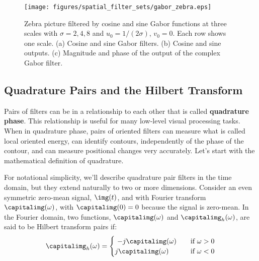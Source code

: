 \begin{figure}[t]
	\texttt{[image: figures/spatial\_filter\_sets/gabor\_zebra.eps]}
	\caption{Zebra picture filtered by cosine and sine Gabor functions at three scales with $\sigma = 2,4,8$ and $u_0 = 1/(2\sigma)$, $v_0=0$. Each row shows one scale. (a) Cosine and sine Gabor filters. (b) Cosine and sine outputs. (c) Magnitude and phase of the output of the complex Gabor filter.}
	\label{fig:gabor_zebra}
\end{figure}

\subsection{Quadrature Pairs and the Hilbert Transform}

Pairs of filters can be in a relationship to each other that is called {\bf quadrature phase}.
This relationship is useful for many low-level visual processing tasks.  When in quadrature phase, pairs of oriented filters can measure what is called local oriented energy, can identify contours, independently of the phase of the contour, and can measure positional changes very accurately. Let's start with the mathematical definition of quadrature.


For notational simplicity, we'll describe quadrature pair filters in the time domain, but they extend naturally to two or more dimensions. Consider an even symmetric zero-mean signal, $\img (t)$, and with Fourier transform $\capitalimg (\omega)$, with $\capitalimg(0)=0$ because the signal is zero-mean. In the Fourier domain, two functions, $\capitalimg (\omega)$ and $\capitalimg_h(\omega)$, are said to be Hilbert transform pairs if:
\begin{equation}
	\capitalimg_h(\omega) = \begin{cases}
		~  - j \capitalimg(\omega) & \quad \text{if } \omega >0 \\
		j \capitalimg(\omega)      & \quad \text{if } \omega <0 \\
	\end{cases}
\end{equation}

